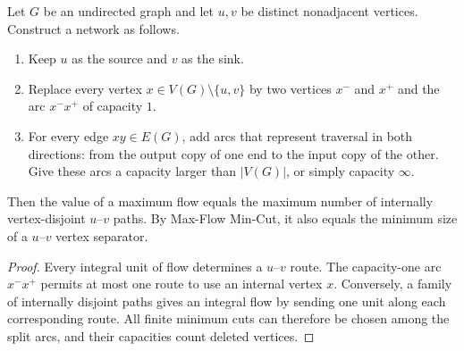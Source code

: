 \begin{noteapplication}
Let $G$ be an undirected graph and let $u,v$ be distinct nonadjacent vertices.
Construct a network as follows.
\begin{enumerate}
  \item Keep $u$ as the source and $v$ as the sink.
  \item Replace every vertex $x\in V(G)\setminus\{u,v\}$ by two vertices
        $x^-$ and $x^+$ and the arc $x^-x^+$ of capacity $1$.
  \item For every edge $xy\in E(G)$, add arcs that represent traversal in
        both directions: from the output copy of one end to the input copy of
        the other.  Give these arcs a capacity larger than $|V(G)|$, or simply
        capacity $\infty$.
\end{enumerate}
Then the value of a maximum flow equals the maximum number of internally
vertex-disjoint $u$--$v$ paths.  By Max-Flow Min-Cut, it also equals the
minimum size of a $u$--$v$ vertex separator.
\end{noteapplication}
\begin{proof}
Every integral unit of flow determines a $u$--$v$ route.  The capacity-one arc
$x^-x^+$ permits at most one route to use an internal vertex $x$.  Conversely,
a family of internally disjoint paths gives an integral flow by sending one
unit along each corresponding route.  All finite minimum cuts can therefore
be chosen among the split arcs, and their capacities count deleted vertices.
\end{proof}

